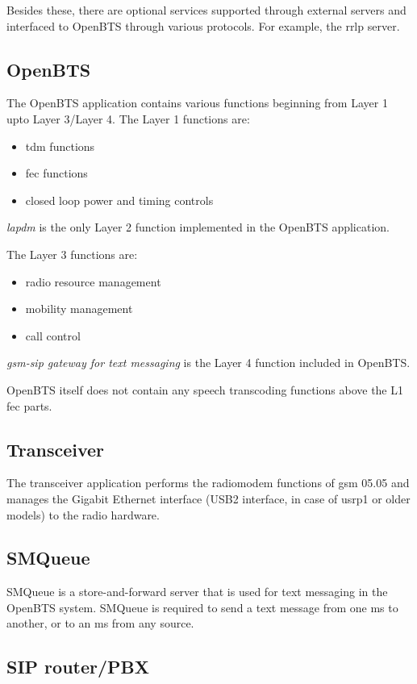 Besides these, there are optional services supported through 
external servers and interfaced to OpenBTS through various protocols. For 
example, the \acrshort{rrlp} server.

\subsection{OpenBTS}
The OpenBTS application contains various functions beginning from Layer 1 upto
Layer 3/Layer 4. The Layer 1 functions are:
\begin{itemize}
\item \acrshort{tdm} functions
\item \acrshort{fec} functions
\item closed loop power and timing controls
\end{itemize}

\emph{\gls{lapdm}} is the only Layer 2 function implemented in the OpenBTS 
application.

The Layer 3 functions are:
\begin{itemize}
\item radio resource management
\item mobility management
\item call control
\end{itemize}

\emph{\gls{gsm}-\gls{sip} gateway for text messaging} is the Layer 4 function included
in OpenBTS.

OpenBTS itself does not contain any speech transcoding
functions above the L1 \acrshort{fec} parts.


\subsection{Transceiver}
The transceiver application performs the radiomodem functions of \gls{gsm} 05.05 and manages 
the Gigabit Ethernet interface
(USB2 interface, in case
of \gls{usrp}1 or older models) to the radio hardware.

\subsection{SMQueue}
SMQueue is a store-and-forward server that is used for 
text messaging in the OpenBTS system. SMQueue is required to send 
a text message from one \gls{ms} to another, or to an \gls{ms} from any source.

\subsection{SIP router/PBX}

